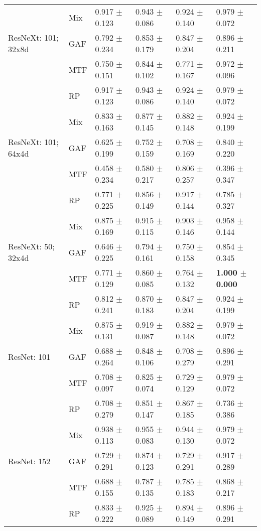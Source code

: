 \begin{longtable}[t]{llllll}
 & Mix & 0.917 $\pm$ 0.123 & 0.943 $\pm$ 0.086 & 0.924 $\pm$ 0.140 & 0.979 $\pm$ 0.072 \\
ResNeXt: 101; 32x8d & GAF & 0.792 $\pm$ 0.234 & 0.853 $\pm$ 0.179 & 0.847 $\pm$ 0.204 & 0.896 $\pm$ 0.211 \\
 & MTF & 0.750 $\pm$ 0.151 & 0.844 $\pm$ 0.102 & 0.771 $\pm$ 0.167 & 0.972 $\pm$ 0.096 \\
 & RP & 0.917 $\pm$ 0.123 & 0.943 $\pm$ 0.086 & 0.924 $\pm$ 0.140 & 0.979 $\pm$ 0.072 \\
 & Mix & 0.833 $\pm$ 0.163 & 0.877 $\pm$ 0.145 & 0.882 $\pm$ 0.148 & 0.924 $\pm$ 0.199 \\
ResNeXt: 101; 64x4d & GAF & 0.625 $\pm$ 0.199 & 0.752 $\pm$ 0.159 & 0.708 $\pm$ 0.169 & 0.840 $\pm$ 0.220 \\
 & MTF & 0.458 $\pm$ 0.234 & 0.580 $\pm$ 0.217 & 0.806 $\pm$ 0.257 & 0.396 $\pm$ 0.347 \\
 & RP & 0.771 $\pm$ 0.225 & 0.856 $\pm$ 0.149 & 0.917 $\pm$ 0.144 & 0.785 $\pm$ 0.327 \\
 & Mix & 0.875 $\pm$ 0.169 & 0.915 $\pm$ 0.115 & 0.903 $\pm$ 0.146 & 0.958 $\pm$ 0.144 \\
ResNeXt: 50; 32x4d & GAF & 0.646 $\pm$ 0.225 & 0.794 $\pm$ 0.161 & 0.750 $\pm$ 0.158 & 0.854 $\pm$ 0.345 \\
 & MTF & 0.771 $\pm$ 0.129 & 0.860 $\pm$ 0.085 & 0.764 $\pm$ 0.132 & \textbf{1.000 $\pm$ 0.000} \\
 & RP & 0.812 $\pm$ 0.241 & 0.870 $\pm$ 0.183 & 0.847 $\pm$ 0.204 & 0.924 $\pm$ 0.199 \\
 & Mix & 0.875 $\pm$ 0.131 & 0.919 $\pm$ 0.087 & 0.882 $\pm$ 0.148 & 0.979 $\pm$ 0.072 \\
ResNet: 101 & GAF & 0.688 $\pm$ 0.264 & 0.848 $\pm$ 0.106 & 0.708 $\pm$ 0.279 & 0.896 $\pm$ 0.291 \\
 & MTF & 0.708 $\pm$ 0.097 & 0.825 $\pm$ 0.074 & 0.729 $\pm$ 0.129 & 0.979 $\pm$ 0.072 \\
 & RP & 0.708 $\pm$ 0.279 & 0.851 $\pm$ 0.147 & 0.867 $\pm$ 0.185 & 0.736 $\pm$ 0.386 \\
 & Mix & 0.938 $\pm$ 0.113 & 0.955 $\pm$ 0.083 & 0.944 $\pm$ 0.130 & 0.979 $\pm$ 0.072 \\
ResNet: 152 & GAF & 0.729 $\pm$ 0.291 & 0.874 $\pm$ 0.123 & 0.729 $\pm$ 0.291 & 0.917 $\pm$ 0.289 \\
 & MTF & 0.688 $\pm$ 0.155 & 0.787 $\pm$ 0.135 & 0.785 $\pm$ 0.183 & 0.868 $\pm$ 0.217 \\
 & RP & 0.833 $\pm$ 0.222 & 0.925 $\pm$ 0.089 & 0.894 $\pm$ 0.149 & 0.896 $\pm$ 0.291 \\

\end{longtable}
